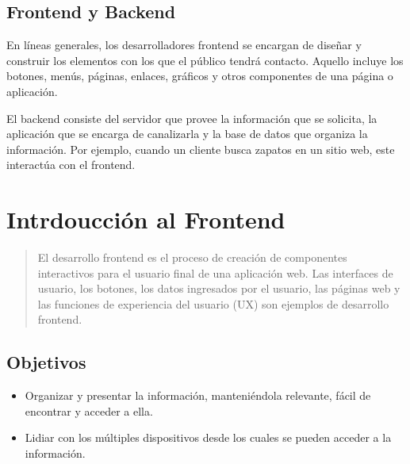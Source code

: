 \documentclass[a4paper,12pt]{article}
\begin{document}
\subsection*{Frontend y Backend}
\begin{center}
\begin{minipage}[position]{0.40\textwidth}
    En líneas generales, los
    desarrolladores frontend se
    encargan de diseñar y construir
    los elementos con los que el
    público tendrá contacto. Aquello
    incluye los botones, menús,
    páginas, enlaces, gráficos y otros
    componentes de una página o
    aplicación.
\end{minipage}
\hspace{5mm}
\begin{minipage}[position]{0.40\textwidth}
    El backend consiste del servidor
    que provee la información que se
    solicita, la aplicación que se
    encarga de canalizarla y la base
    de datos que organiza la
    información. Por ejemplo, cuando
    un cliente busca zapatos en un
    sitio web, este interactúa con el
    frontend.
\end{minipage}
\end{center}

\section{Intrdoucción al Frontend}

\begin{quote}
El desarrollo frontend es el proceso de creación de componentes interactivos para 
el usuario final de una aplicación web. Las interfaces de usuario, los botones, los
datos ingresados por el usuario, las páginas web y las funciones de experiencia 
del usuario (UX) son ejemplos de desarrollo frontend.
\end{quote}

\subsection*{Objetivos}
\begin{itemize}
    \item Organizar y presentar la información, manteniéndola relevante,
     fácil de encontrar y acceder a ella.
    \item Lidiar con los múltiples dispositivos desde los cuales se 
     pueden acceder a la información.    
\end{itemize}
\end{document}
